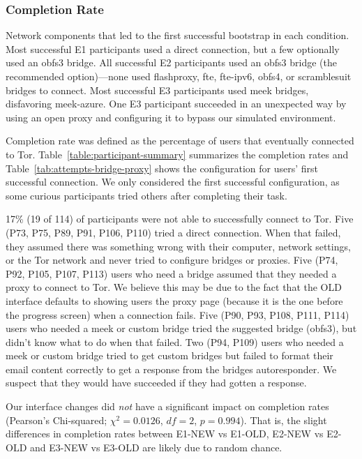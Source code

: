 \documentclass[USenglish,oneside,twocolumn]{article}
\begin{document}
\subsubsection{Completion Rate} 

\begin{table}[t]
\centering

\caption{
Network components that led to the first successful bootstrap
in each condition.
Most successful E1 participants used a direct connection,
but a few optionally used an obfs3 bridge.
All successful E2 participants used 
an obfs3 bridge (the recommended option)---none used 
flashproxy, fte, fte-ipv6, obfs4, or scramblesuit bridges to connect. 
Most successful E3 participants
used meek bridges, disfavoring meek-azure.
One E3 participant succeeded in an unexpected way
by using an open proxy and configuring it to bypass our 
simulated environment.
}
\label{tab:attempts-bridge-proxy}
\end{table}

Completion rate was defined as the percentage of users that eventually connected to Tor. Table~\ref{table:participant-summary} summarizes the completion rates and Table~\ref{tab:attempts-bridge-proxy} shows the configuration for users' first successful connection. We only considered the first successful configuration, as some curious participants tried others after completing their task. 

17\% (19 of 114) of participants were not able to successfully connect to Tor. Five (P73, P75, P89, P91, P106, P110) tried a direct connection. When that failed, they assumed there was something wrong with their computer, network settings, or the Tor network and never tried to configure bridges or proxies. Five (P74, P92, P105, P107, P113) users who need a bridge assumed that they needed a proxy to connect to Tor. We believe this may be due to the fact that the OLD interface defaults to showing users the proxy page (because it is the one before the progress screen) when a connection fails. Five (P90, P93, P108, P111, P114) users who needed a meek or custom bridge tried the suggested bridge (obfs3), but didn't know what to do when that failed. Two (P94, P109) users who needed a meek or custom bridge tried to get custom bridges but failed to format their email content correctly to get a response from the bridges autoresponder. We suspect that they would have succeeded if they had gotten a response. 

Our interface changes did {\it not} have a significant impact on completion rates (Pearson's Chi-squared; $\chi^2 = 0.0126$, $df = 2$, $p = 0.994$). That is, the slight differences in completion rates between E1-NEW vs E1-OLD, E2-NEW vs E2-OLD and E3-NEW vs E3-OLD are likely due to random chance.
\end{document}
